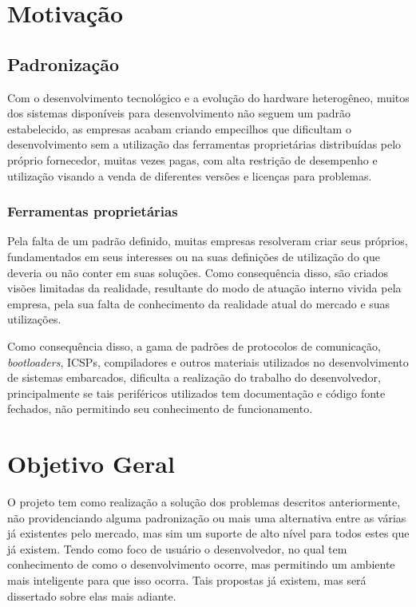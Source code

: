 \section{Motivação}

\subsection{Padronização}
Com o desenvolvimento tecnológico e a evolução do hardware heterogêneo, muitos dos sistemas disponíveis para desenvolvimento não seguem um padrão estabelecido, as empresas acabam criando empecilhos que dificultam o desenvolvimento sem a utilização das ferramentas proprietárias distribuídas pelo próprio fornecedor, muitas vezes pagas, com alta restrição de desempenho e utilização visando a venda de diferentes versões e licenças para problemas.

\subsubsection{Ferramentas proprietárias}
Pela falta de um padrão definido, muitas empresas resolveram criar seus próprios, fundamentados em seus interesses ou na suas definições de utilização do que deveria ou não conter em suas soluções. Como consequência disso, são criados visões limitadas da realidade, resultante do modo de atuação interno vivida pela empresa, pela sua falta de conhecimento da realidade atual do mercado e suas utilizações.

Como consequência disso, a gama de padrões de protocolos de comunicação, \textit{bootloaders}, ICSPs, compiladores e outros materiais utilizados no desenvolvimento de sistemas embarcados, dificulta a realização do trabalho do desenvolvedor, principalmente se tais periféricos utilizados tem documentação e código fonte fechados, não permitindo seu conhecimento de funcionamento.



\section{Objetivo Geral}
O projeto tem como realização a solução dos problemas descritos anteriormente, não providenciando alguma padronização ou mais uma alternativa entre as várias já existentes pelo mercado, mas sim um suporte de alto nível para todos estes que já existem. Tendo como foco de usuário o desenvolvedor, no qual tem conhecimento de como o desenvolvimento ocorre, mas permitindo um ambiente mais inteligente para que isso ocorra. Tais propostas já existem, mas será dissertado sobre elas mais adiante.

